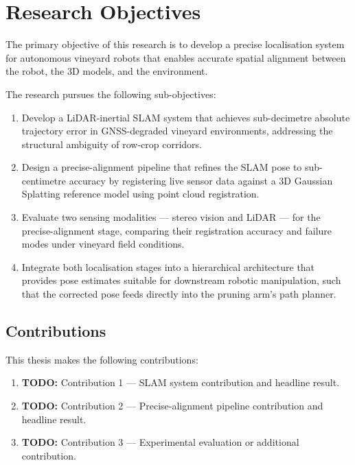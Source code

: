 \section{Research Objectives}
\label{sec:research-objectives}

The primary objective of this research is to develop a precise localisation system for autonomous vineyard robots that enables accurate spatial alignment between the robot, the 3D models, and the environment.

The research pursues the following sub-objectives:

\begin{enumerate}

    \item Develop a LiDAR-inertial SLAM system that achieves sub-decimetre absolute trajectory error in GNSS-degraded vineyard environments, addressing the structural ambiguity of row-crop corridors.

    \item Design a precise-alignment pipeline that refines the SLAM pose to sub-centimetre accuracy by registering live sensor data against a 3D Gaussian Splatting reference model using point cloud registration.

    \item Evaluate two sensing modalities --- stereo vision and LiDAR --- for the precise-alignment stage, comparing their registration accuracy and failure modes under vineyard field conditions.

    \item Integrate both localisation stages into a hierarchical architecture that provides pose estimates suitable for downstream robotic manipulation, such that the corrected pose feeds directly into the pruning arm's path planner.

\end{enumerate}

\subsection{Contributions}
\label{subsec:contributions}

This thesis makes the following contributions:

\begin{enumerate}
    \item \textbf{TODO:} Contribution 1 --- SLAM system contribution and headline result.
    \item \textbf{TODO:} Contribution 2 --- Precise-alignment pipeline contribution and headline result.
    \item \textbf{TODO:} Contribution 3 --- Experimental evaluation or additional contribution.
\end{enumerate}
